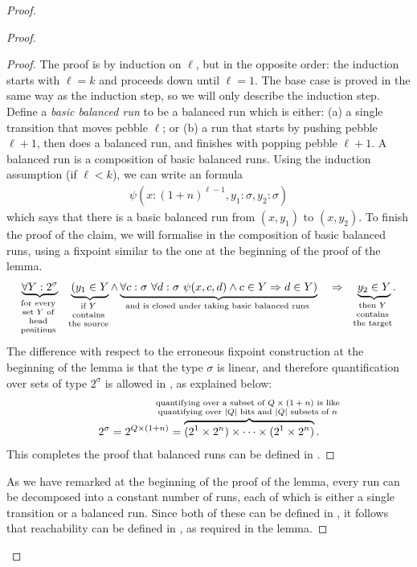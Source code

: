 \begin{proof}
\begin{proof}
\begin{proof}
    The proof is by induction on $\ell$, but in the opposite order: the induction starts with $\ell=k$ and proceeds down until $\ell=1$. The base case is proved in the same way as the induction step, so we will only describe the induction step. Define a \emph{basic balanced run} to be a balanced run which is either: (a) a single transition that moves pebble $\ell$; or (b) a run that starts by pushing pebble $\ell+1$, then does a balanced run, and finishes with popping pebble $\ell+1$. A balanced run is a composition of basic balanced runs. Using the induction assumption (if $\ell < k$), we can write an \mso formula 
    \begin{align*}
    \psi(x : (1+n)^{\ell-1}, y_1  : \sigma, y_2 : \sigma)
    \end{align*}
    which says that there is a basic balanced run from  $(x,y_1)$ to  $(x,y_2)$.  To finish the proof of the claim, we will formalise in \mso the composition of basic balanced runs, using a fixpoint similar to the one at the beginning of the proof of the lemma.
            \begin{align*}
        \myunderbrace{\forall Y : 2^\sigma}{for every \\ set $Y$ of \\ head\\ positions} 
        \quad 
        \myunderbrace{(y_1 \in Y}{if $Y$ \\ contains\\ the source} \land \myunderbrace{\forall c : \sigma \ \forall d : \sigma\  \psi(x,c,d) \land c \in Y \Rightarrow d \in Y)}{and is closed under  taking basic balanced runs} \quad \Rightarrow \quad \myunderbrace{y_2 \in Y}{then  $Y$ \\ contains\\ the target}.
        \end{align*}
    The difference with respect to the erroneous fixpoint construction at the beginning of the lemma is that the type $\sigma$ is linear, and therefore quantification over sets of type $2^\sigma$ is allowed in \mso, as explained below:
\begin{align*}
2^\sigma = 2^{Q \times (1+n)} = \myoverbrace{(2^{1} \times 2^{n}) \times \cdots \times (2^{1} \times 2^{n})}{quantifying over a subset of $Q \times (1+n)$ is like \\ quantifying over $|Q|$ bits and $|Q|$ subsets of $n$}.
\end{align*}
This completes the proof that balanced runs can be defined in \mso.
\end{proof}

As we have remarked at the beginning of the proof of the lemma, every run can be decomposed into a constant number of runs, each of which is either a single transition or a balanced run. Since both of these can be defined in \mso, it follows that reachability can be defined in \mso, as required in the lemma. 
    \end{proof}
\end{proof}




